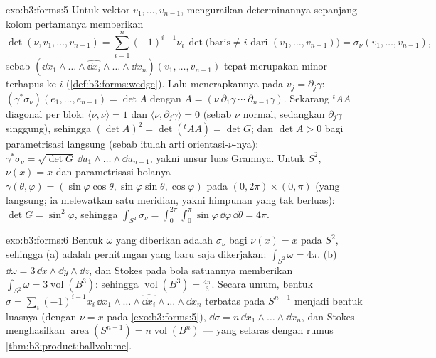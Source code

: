 \begin{solution}{exo:b3:forms:5}
Untuk vektor $v_1, \dots, v_{n-1}$, menguraikan determinannya
sepanjang kolom pertamanya memberikan
\[
\det(\nu, v_1, \dots, v_{n-1}) =
\sum_{i=1}^n(-1)^{i-1}\nu_i\,
\det\bigl(\text{baris} \neq i \text{ dari } (v_1, \dots,
v_{n-1})\bigr)
= \sigma_\nu(v_1, \dots, v_{n-1}),
\]
sebab $(\dd x_1\wedge\dots\wedge\widehat{\dd
x_i}\wedge\dots\wedge\dd x_n)(v_1, \dots, v_{n-1})$ tepat
merupakan minor terhapus ke-$i$
(\cref{def:b3:forms:wedge}). Lalu menerapkannya pada $v_j =
\partial_j\gamma$: $(\gamma^*\sigma_\nu)(e_1, \dots,
e_{n-1}) = \det A$ dengan $A = (\nu\ \partial_1\gamma\ \cdots\
\partial_{n-1}\gamma)$. Sekarang ${}^t\!AA$ diagonal per blok:
$\langle\nu, \nu\rangle = 1$ dan $\langle\nu,
\partial_j\gamma\rangle = 0$ (sebab $\nu$ normal, sedangkan
$\partial_j\gamma$ singgung), sehingga $(\det A)^2 =
\det({}^t\!AA) = \det G$; dan $\det A > 0$ bagi parametrisasi
langsung (sebab itulah arti orientasi-$\nu$-nya):
$\gamma^*\sigma_\nu = \sqrt{\det G}\,\dd
u_1\wedge\dots\wedge\dd u_{n-1}$, yakni unsur luas Gramnya. Untuk
$S^2$, $\nu(x) = x$ dan parametrisasi bolanya
$\gamma(\theta, \varphi) = (\sin\varphi\cos\theta,
\sin\varphi\sin\theta, \cos\varphi)$ pada
$(0,2\pi)\times(0,\pi)$ (yang langsung; ia melewatkan satu meridian, yakni
himpunan yang tak berluas): $\det G = \sin^2\varphi$, sehingga
$\int_{S^2}\sigma_\nu =
\int_0^{2\pi}\!\!\int_0^\pi\sin\varphi\,\dd\varphi\,
\dd\theta = 4\pi$.
\end{solution}

\begin{solution}{exo:b3:forms:6}
Bentuk $\omega$ yang diberikan adalah $\sigma_\nu$ bagi $\nu(x) = x$ pada
$S^2$, sehingga (a) adalah perhitungan yang baru saja dikerjakan:
$\int_{S^2}\omega = 4\pi$. (b) $\dd\omega = 3\,\dd
x\wedge\dd y\wedge\dd z$, dan Stokes pada bola satuannya memberikan
$\int_{S^2}\omega = 3\operatorname{vol}(B^3)$: sehingga
$\operatorname{vol}(B^3) = \frac{4\pi}3$. Secara umum,
bentuk $\sigma = \sum_i(-1)^{i-1}x_i\,\dd
x_1\wedge\dots\wedge\widehat{\dd x_i}\wedge\dots\wedge\dd
x_n$ terbatas pada $S^{n-1}$ menjadi bentuk luasnya (dengan $\nu = x$ pada
\cref{exo:b3:forms:5}), $\dd\sigma = n\,\dd
x_1\wedge\dots\wedge\dd x_n$, dan Stokes menghasilkan
$\operatorname{area}(S^{n-1}) = n\operatorname{vol}(B^n)$
--- yang selaras dengan rumus 
\cref{thm:b3:product:ballvolume}.
\end{solution}

